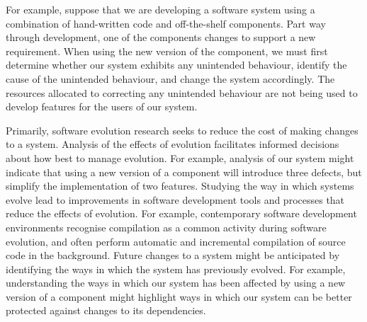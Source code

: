 For example, suppose that we are developing a software system using a combination of hand-written code and off-the-shelf components. Part way through development, one of the components changes to support a new requirement. When using the new version of the component, we must first determine whether our system exhibits any unintended behaviour, identify the cause of the unintended behaviour, and change the system accordingly. The resources allocated to correcting any unintended behaviour are not being used to develop features for the users of our system.

Primarily, software evolution research seeks to reduce the cost of making changes to a system. Analysis of the effects of evolution facilitates informed decisions about how best to manage evolution. For example, analysis of our system might indicate that using a new version of a component will introduce three defects, but simplify the implementation of two features. Studying the way in which systems evolve lead to improvements in software development tools and processes that reduce the effects of evolution. For example, contemporary software development environments recognise compilation as a common activity during software evolution, and often perform automatic and incremental compilation of source code in the background. Future changes to a system might be anticipated by identifying the ways in which the system has previously evolved. For example, understanding the ways in which our system has been affected by using a new version of a component might highlight ways in which our system can be better protected against changes to its dependencies.



